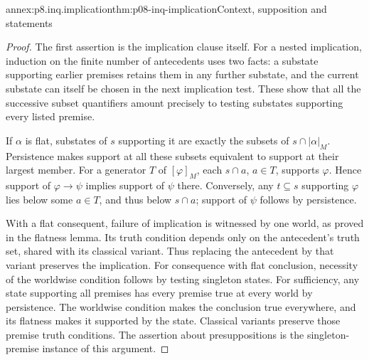 \begin{annexitem}{annex:p8.inq.implication}{thm:p08-inq-implication}{Context, supposition and statements}
\begin{proof}
The first assertion is the implication clause itself. For a nested
implication, induction on the finite number of antecedents uses two facts:
a substate supporting earlier premises retains them in any further substate,
and the current substate can itself be chosen in the next implication test.
These show that all the successive subset quantifiers amount precisely to
testing substates supporting every listed premise.

If \(\alpha\) is flat, substates of \(s\) supporting it are exactly the
subsets of \(s\cap|\alpha|_M\). Persistence makes support at all these
subsets equivalent to support at their largest member. For a generator
\(T\) of \([\varphi]_M\), each \(s\cap a\), \(a\in T\), supports
\(\varphi\). Hence support of \(\varphi\to\psi\) implies support of
\(\psi\) there. Conversely, any \(t\subseteq s\) supporting \(\varphi\)
lies below some \(a\in T\), and thus below \(s\cap a\); support of
\(\psi\) follows by persistence.

With a flat consequent, failure of implication is witnessed by one world,
as proved in the flatness lemma. Its truth condition depends only on the
antecedent's truth set, shared with its classical variant. Thus replacing
the antecedent by that variant preserves the implication. For consequence
with flat conclusion, necessity of the worldwise condition follows by
testing singleton states. For sufficiency, any state supporting all premises
has every premise true at every world by persistence. The worldwise
condition makes the conclusion true everywhere, and its flatness makes
it supported by the state. Classical variants preserve those premise truth
conditions. The assertion about presuppositions is the singleton-premise
instance of this argument.
\end{proof}
\end{annexitem}

